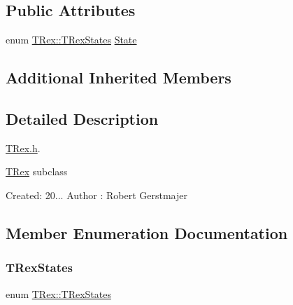\subsection*{Public Attributes}
\begin{DoxyCompactItemize}
\item 
enum \mbox{\hyperlink{class_t_rex_a000c4d51b41f07886af073a6b7b3e063}{T\+Rex\+::\+T\+Rex\+States}} \mbox{\hyperlink{class_t_rex_afac420bc35ec1ba3aab6d7016285a79e}{State}}
\end{DoxyCompactItemize}
\subsection*{Additional Inherited Members}


\subsection{Detailed Description}
\mbox{\hyperlink{_t_rex_8h}{T\+Rex.\+h}}. 

\mbox{\hyperlink{class_t_rex}{T\+Rex}} subclass

Created\+: 20... Author \+: Robert Gerstmajer 

\subsection{Member Enumeration Documentation}
\mbox{\label{class_t_rex_a000c4d51b41f07886af073a6b7b3e063}} 
\subsubsection{\texorpdfstring{T\+Rex\+States}{TRexStates}}
{\footnotesize\ttfamily enum \mbox{\hyperlink{class_t_rex_a000c4d51b41f07886af073a6b7b3e063}{T\+Rex\+::\+T\+Rex\+States}}}

